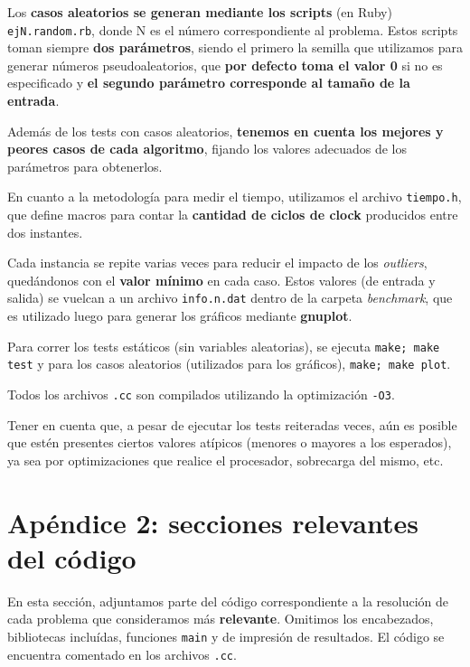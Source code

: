 \documentclass[a4paper]{article}
\begin{document}
Los \textbf{casos aleatorios se generan mediante los scripts} (en Ruby) \verb|ejN.random.rb|, donde
N es el número correspondiente al problema. Estos scripts toman siempre \textbf{dos parámetros},
siendo el primero la semilla que utilizamos para generar números pseudoaleatorios, que
\textbf{por defecto toma el valor 0} si no es especificado y \textbf{el segundo parámetro corresponde
al tamaño de la entrada}.

Además de los tests con casos aleatorios, \textbf{tenemos en cuenta los mejores y peores
casos de cada algoritmo}, fijando los valores adecuados de los parámetros para
obtenerlos. \medskip

En cuanto a la metodología para medir el tiempo, utilizamos el archivo \verb|tiempo.h|,
que define macros para contar la \textbf{cantidad de ciclos de clock} producidos entre dos instantes. \medskip

Cada instancia se repite varias veces para reducir el impacto de los \textit{outliers}, quedándonos
con el \textbf{valor mínimo} en cada caso. Estos valores (de entrada y salida) se vuelcan a un archivo
\verb|info.n.dat| dentro de la carpeta \textit{benchmark}, que es utilizado luego para generar los gráficos
mediante \textbf{gnuplot}. \medskip

Para correr los tests estáticos (sin variables aleatorias), se ejecuta \verb|make; make test| y para los
casos aleatorios (utilizados para los gráficos), \verb|make; make plot|.

Todos los archivos \verb|.cc| son compilados utilizando la optimización \verb|-O3|. \medskip

Tener en cuenta que, a pesar de ejecutar los tests reiteradas veces, aún es posible que estén presentes ciertos
valores atípicos (menores o mayores a los esperados), ya sea por optimizaciones que realice el procesador, sobrecarga
del mismo, etc.
\newpage

\section{Apéndice 2: secciones relevantes del código}

En esta sección, adjuntamos parte del código correspondiente a la resolución de cada problema que consideramos más \textbf{relevante}. Omitimos los encabezados, bibliotecas incluídas, funciones \verb|main| y de impresión de resultados. El código se encuentra comentado en los archivos \verb|.cc|.

\end{document}
